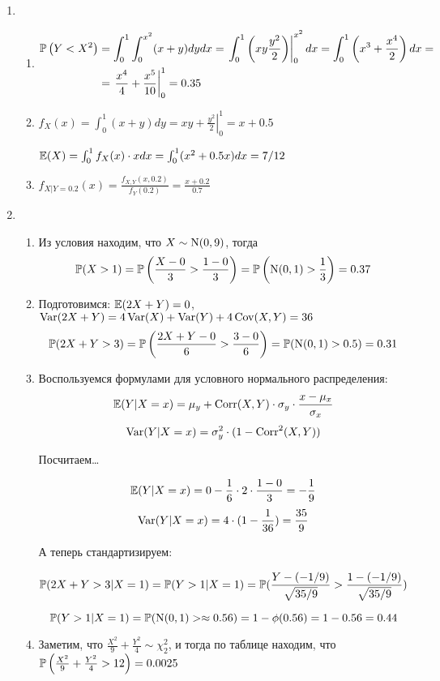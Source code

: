 \begin{enumerate}
\item
\begin{enumerate}
\item
\begin{align*}
\P\left(Y<X^2\right) &= \int_0^1 \int_0^{x^2} (x+y) dy dx = \left. \int_0^1 \left(xy \frac{y^2}{2} \right) \right|_0^{x^2} dx =  \int_0^1 \left(x^3 + \frac{x^4}{2} \right) dx = \\
&= \left. \frac{x^4}{4} + \frac{x^5}{10} \right|_0^1 = 0.35
\end{align*}
\item $f_X (x) = \int_0^1 (x+y) dy = \left. xy + \frac{y^2}{2} \right|_0^1 = x + 0.5$

$\E(X) = \int_0^1 f_X (x) \cdot x dx = \int_0^1 (x^2 + 0.5x) dx = 7/12$
\item $f_{X|Y=0.2}(x) = \frac{f_{X, Y}(x, 0.2)}{f_Y (0.2)} = \frac{x+0.2}{0.7}$
\end{enumerate}
\item
\begin{enumerate}
\item Из условия находим, что $X \sim \cN (0, 9)$, тогда
\[
\P(X>1) = \P \left(\frac{X-0}{3} > \frac{1-0}{3} \right) = \P\left(\cN(0,1) > \frac{1}{3} \right) = 0.37
\]
\item Подготовимся: $\E(2X+Y) = 0$, $\Var(2X+Y) = 4\Var(X) + \Var(Y) + 4 \Cov(X, Y) = 36$
\[
\P(2X+Y > 3) = \P\left(\frac{2X+Y-0}{6} > \frac{3-0}{6} \right) = \P(\cN(0, 1) > 0.5) = 0.31
\]
\item Воспользуемся формулами для условного нормального распределения:
\[
	\E(Y|X=x) = \mu_{y} + \Corr(X, Y)\cdot \sigma_{y}\cdot \frac{x-\mu_{x}}{\sigma_{x}}
\]
\[
	\Var(Y|X=x) = \sigma^{2}_{y}\cdot (1 - \Corr^{2}(X, Y))
\]

Посчитаем\ldots

\[
	\E(Y|X=x) = 0 - \frac{1}{6}\cdot 2 \cdot \frac{1-0}{3} = -\frac{1}{9}
\]
\[
	\Var(Y|X=x) =4\cdot (1 - \frac{1}{36}) = \frac{35}{9} 
\]

А теперь стандартизируем:

\[
	\P(2X + Y >3|X=1) = 
	\P(Y>1|X=1) = \P(\frac{Y - (-1/9)}{\sqrt{35/9}}>\frac{1 - (-1/9)}{\sqrt{35/9}})
\]

\[
	\P(Y>1|X=1) = \P(\cN(0,1)>  \approx 0.56) = 1-\phi(0.56) = 1 - 0.56 = 0.44
\]
\item Заметим, что $\frac{X^2}{9}+\frac{Y^2}{4} \sim \chi^2_2$,
и тогда по таблице находим, что $\P\left(\frac{X^2}{9}+\frac{Y^2}{4} >12\right) = 0.0025$


\end{enumerate}
\end{enumerate}
